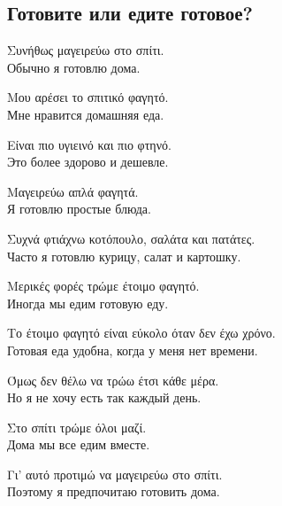 \documentclass[12pt]{article}
\newcommand{\my}[1]{\textcolor{gray!80!white}{#1}}
\newenvironment{page}{\clearpage\normalsize\null\vfill}{\vfill\null}
\newenvironment{textblock}{\begin{minipage}{\textwidth}}{\end{minipage}\smallskip}
\begin{document}
	\begin{page}
		\subsection{Готовите или едите готовое?}
		\small
		\begin{textblock}
			Συνήθως μαγειρεύω στο σπίτι.\\
			\my{Обычно я готовлю дома.}
			
			Μου αρέσει το σπιτικό φαγητό.\\
			\my{Мне нравится домашняя еда.}
			
			Είναι πιο υγιεινό και πιο φτηνό.\\
			\my{Это более здорово и дешевле.}
			
			Μαγειρεύω απλά φαγητά.\\
			\my{Я готовлю простые блюда.}
			
			Συχνά φτιάχνω κοτόπουλο, σαλάτα και πατάτες.\\
			\my{Часто я готовлю курицу, салат и картошку.}
			
			Μερικές φορές τρώμε έτοιμο φαγητό.\\
			\my{Иногда мы едим готовую еду.}
			
			Το έτοιμο φαγητό είναι εύκολο όταν δεν έχω χρόνο.\\
			\my{Готовая еда удобна, когда у меня нет времени.}
			
			Όμως δεν θέλω να τρώω έτσι κάθε μέρα.\\
			\my{Но я не хочу есть так каждый день.}
			
			Στο σπίτι τρώμε όλοι μαζί.\\
			\my{Дома мы все едим вместе.}
			
			Γι’ αυτό προτιμώ να μαγειρεύω στο σπίτι.\\
			\my{Поэтому я предпочитаю готовить дома.}
		\end{textblock}
	\end{page}
	
%			
\end{document}
